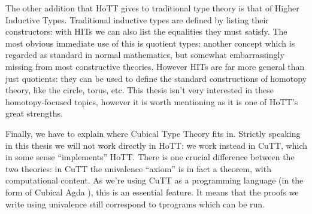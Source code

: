 The other addition that HoTT gives to traditional type theory is that of Higher
Inductive Types.
Traditional inductive types are defined by listing their constructors: with HITs
we can also list the equalities they must satisfy.
The most obvious immediate use of this is quotient types: another concept which
is regarded as standard in normal mathematics, but somewhat embarrassingly
missing from most constructive theories.
However HITs are far more general than just quotients: they can be used to
define the standard constructions of homotopy theory, like the circle, torus,
etc.
This thesis isn't very interested in these homotopy-focused topics, however it
is worth mentioning as it is one of HoTT's great strengths.

Finally, we have to explain where Cubical Type Theory
\citep{cohenCubicalTypeTheory2016} fits in.
Strictly speaking in this thesis we will not work directly in HoTT: we work
instead in CuTT, which in some sense ``implements'' HoTT\footnotemark.
There is one crucial difference between the two theories: in CuTT the
univalence ``axiom'' is in fact a theorem, with computational content.
As we're using CuTT as a programming language (in the form of Cubical Agda
\citep{vezzosiCubicalAgdaDependently2019}), this is an essential feature.
It means that the proofs we write using univalence still correspond to tprograms
which can be run.



